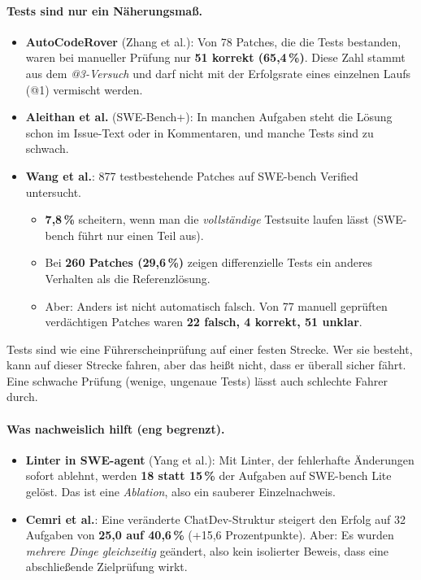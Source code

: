 \documentclass[11pt,a4paper,parskip=half]{scrartcl}
\begin{document}
\paragraph{Tests sind nur ein Näherungsmaß.}
\begin{itemize}
\item \textbf{AutoCodeRover} (Zhang et al.): Von 78 Patches, die die Tests bestanden, waren bei manueller Prüfung nur \textbf{51 korrekt (65,4\,\%)}. Diese Zahl stammt aus dem \emph{@3-Versuch} und darf nicht mit der Erfolgsrate eines einzelnen Laufs (@1) vermischt werden.
\item \textbf{Aleithan et al.} (SWE-Bench+): In manchen Aufgaben steht die Lösung schon im Issue-Text oder in Kommentaren, und manche Tests sind zu schwach.
\item \textbf{Wang et al.}: 877 testbestehende Patches auf SWE-bench Verified untersucht.
  \begin{itemize}
  \item \textbf{7,8\,\%} scheitern, wenn man die \emph{vollständige} Testsuite laufen lässt (SWE-bench führt nur einen Teil aus).
  \item Bei \textbf{260 Patches (29,6\,\%)} zeigen differenzielle Tests ein anderes Verhalten als die Referenzlösung.
  \item Aber: Anders ist nicht automatisch falsch. Von 77 manuell geprüften verdächtigen Patches waren \textbf{22 falsch, 4 korrekt, 51 unklar}.
  \end{itemize}
\end{itemize}

\begin{beispiel}
Tests sind wie eine Führerscheinprüfung auf einer festen Strecke. Wer sie besteht, kann auf dieser Strecke fahren, aber das heißt nicht, dass er überall sicher fährt. Eine schwache Prüfung (wenige, ungenaue Tests) lässt auch schlechte Fahrer durch.
\end{beispiel}

\paragraph{Was nachweislich hilft (eng begrenzt).}
\begin{itemize}
\item \textbf{Linter in SWE-agent} (Yang et al.): Mit Linter, der fehlerhafte Änderungen sofort ablehnt, werden \textbf{18 statt 15\,\%} der Aufgaben auf SWE-bench Lite gelöst. Das ist eine \emph{Ablation}, also ein sauberer Einzelnachweis.
\item \textbf{Cemri et al.}: Eine veränderte ChatDev-Struktur steigert den Erfolg auf 32 Aufgaben von \textbf{25,0 auf 40,6\,\%} (+15,6 Prozentpunkte). Aber: Es wurden \emph{mehrere Dinge gleichzeitig} geändert, also kein isolierter Beweis, dass eine abschließende Zielprüfung wirkt.
\end{itemize}
\end{document}
